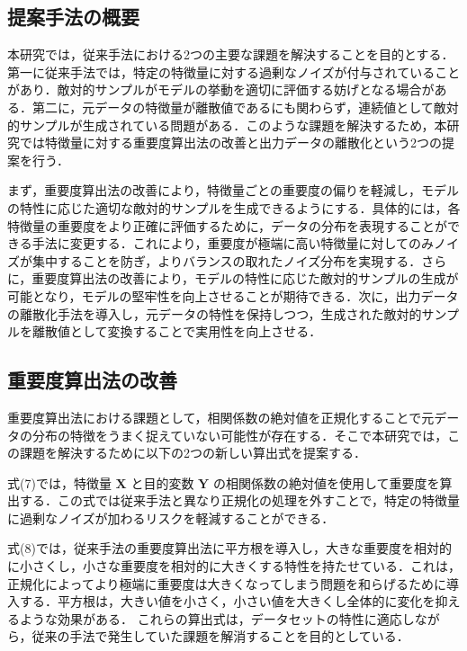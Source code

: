 \subsection{提案手法の概要}
本研究では，従来手法における2つの主要な課題を解決することを目的とする．第一に従来手法では，特定の特徴量に対する過剰なノイズが付与されていることがあり．敵対的サンプルがモデルの挙動を適切に評価する妨げとなる場合がある．第二に，元データの特徴量が離散値であるにも関わらず，連続値として敵対的サンプルが生成されている問題がある．このような課題を解決するため，本研究では特徴量に対する重要度算出法の改善と出力データの離散化という2つの提案を行う．

まず，重要度算出法の改善により，特徴量ごとの重要度の偏りを軽減し，モデルの特性に応じた適切な敵対的サンプルを生成できるようにする．具体的には，各特徴量の重要度をより正確に評価するために，データの分布を表現することができる手法に変更する．これにより，重要度が極端に高い特徴量に対してのみノイズが集中することを防ぎ，よりバランスの取れたノイズ分布を実現する．さらに，重要度算出法の改善により，モデルの特性に応じた敵対的サンプルの生成が可能となり，モデルの堅牢性を向上させることが期待できる．次に，出力データの離散化手法を導入し，元データの特性を保持しつつ，生成された敵対的サンプルを離散値として変換することで実用性を向上させる．

\subsection{重要度算出法の改善}
重要度算出法における課題として，相関係数の絶対値を正規化することで元データの分布の特徴をうまく捉えていない可能性が存在する．そこで本研究では，この課題を解決するために以下の2つの新しい算出式を提案する．


式(7)では，特徴量 $\bm{X}$ と目的変数 $\bm{Y}$ の相関係数の絶対値を使用して重要度を算出する．この式では従来手法と異なり正規化の処理を外すことで，特定の特徴量に過剰なノイズが加わるリスクを軽減することができる．

式(8)では，従来手法の重要度算出法に平方根を導入し，大きな重要度を相対的に小さくし，小さな重要度を相対的に大きくする特性を持たせている．これは，正規化によってより極端に重要度は大きくなってしまう問題を和らげるために導入する．平方根は，大きい値を小さく，小さい値を大きくし全体的に変化を抑えるような効果がある．
これらの算出式は，データセットの特性に適応しながら，従来の手法で発生していた課題を解消することを目的としている．

